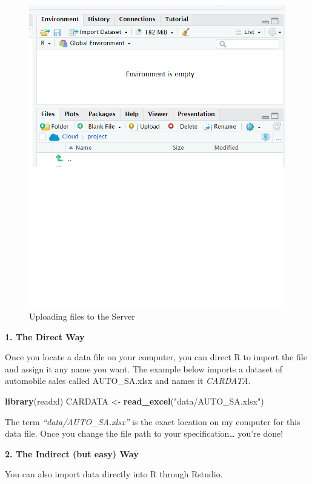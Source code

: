 \documentclass[
]{book}
\newenvironment{Shaded}{\begin{snugshade}}{\end{snugshade}}
\newcommand{\FunctionTok}[1]{\textcolor[rgb]{0.13,0.29,0.53}{\textbf{#1}}}
\newcommand{\NormalTok}[1]{#1}
\newcommand{\OtherTok}[1]{\textcolor[rgb]{0.56,0.35,0.01}{#1}}
\newcommand{\StringTok}[1]{\textcolor[rgb]{0.31,0.60,0.02}{#1}}
\begin{document}
\begin{figure}

{\centering \includegraphics[width=0.75\linewidth]{images/Upload} 

}

\caption{Uploading files to the Server}\label{fig:unnamed-chunk-37}
\end{figure}

\textbf{1. The Direct Way}

Once you locate a data file on your computer, you can direct R to import the file and assign it any name you want. The example below imports a dataset of automobile sales called AUTO\_SA.xlsx and names it \emph{CARDATA}.

\begin{Shaded}
\begin{Highlighting}[]
\FunctionTok{library}\NormalTok{(readxl)}
\NormalTok{CARDATA }\OtherTok{\textless{}{-}} \FunctionTok{read\_excel}\NormalTok{(}\StringTok{"data/AUTO\_SA.xlsx"}\NormalTok{)}
\end{Highlighting}
\end{Shaded}

The term \emph{``data/AUTO\_SA.xlsx''} is the exact location on my computer for this data file. Once you change the file path to your specification\ldots{} you're done!

\textbf{2. The Indirect (but easy) Way}

You can also import data directly into R through Rstudio.
\end{document}
